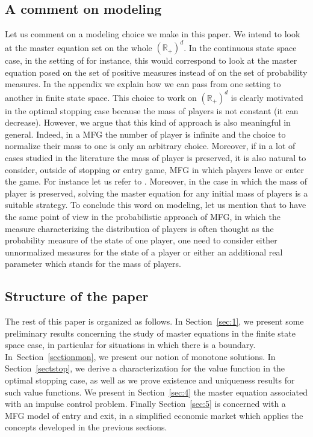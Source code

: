 \documentclass[JEP,XML,SOM,Unicode,NoEqCountersInSection,published]{cedram}
\theoremstyle{definition}
\begin{document}
\subsection*{A comment on modeling}
Let us comment on a modeling choice we make in this paper. We intend to look at the master equation set on the whole $(\mathbb{R}_+)^d$. In the continuous state space case, in the setting of \cite{cardaliaguet2019master} for instance, this would correspond to look at the master equation posed on the set of positive measures instead of on the set of probability measures. In the appendix we explain how we can pass from one setting to another in finite state space. This choice to work on $(\mathbb{R}_+)^d$ is clearly motivated in the optimal stopping case because the mass of players is not constant (it can decrease). However, we argue that this kind of approach is also meaningful in general. Indeed, in a MFG the number of player is infinite and the choice to normalize their mass to one is only an arbitrary choice. Moreover, if in a lot of cases studied in the literature the mass of player is preserved, it is also natural to consider, outside of stopping or entry game, MFG in which players leave or enter the game. For instance let us refer to \cite{claisse2019mean}. Moreover, in the case in which the mass of player is preserved, solving the master equation for any initial mass of players is a suitable strategy. To conclude this word on modeling, let us mention that to have the same point of view in the probabilistic approach of MFG, in which the measure characterizing the distribution of players is often thought as the probability measure of the state of one player, one need to consider either unnormalized measures for the state of a player or either an additional real parameter which stands for the mass of players.

\subsection*{Structure of the paper}
The rest of this paper is organized as follows. In Section~\ref{sec:1}, we present some preliminary results concerning the study of master equations in the finite state space case, in particular for situations in which there is a boundary. In~Section~\ref{sectionmon}, we present our notion of monotone solutions. In Section~\ref{sectstop}, we derive a characterization for the value function in the optimal stopping case, as well as we prove existence and uniqueness results for such value functions. We present in Section~\ref{sec:4} the master equation associated with an impulse control problem. Finally Section~\ref{sec:5} is concerned with a MFG model of entry and exit, in a simplified economic market which applies the concepts developed in the previous sections.
\end{document}
